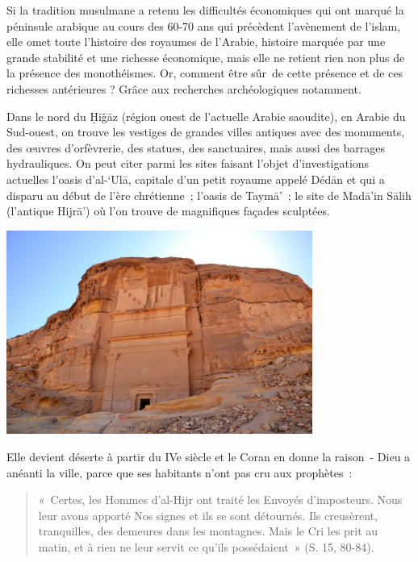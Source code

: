 Si la tradition musulmane a retenu les difficultés économiques qui ont
marqué la péninsule arabique au cours des 60-70 ans qui précèdent
l'avènement de l'islam, elle omet toute l'histoire des royaumes de
l'Arabie, histoire marquée par une grande stabilité et une richesse
économique, mais elle ne retient rien non plus de la présence des
monothéismes. Or, comment être sûr~de cette présence et de ces richesses
antérieures ? Grâce aux recherches archéologiques notamment.


Dans le nord du Ḥiǧāz (région ouest de l'actuelle Arabie saoudite), en
Arabie du Sud-ouest, on trouve les vestiges de grandes villes antiques
avec des monuments, des œuvres d'orfèvrerie, des statues, des
sanctuaires, mais aussi des barrages hydrauliques. On peut citer parmi
les sites faisant l'objet d'investigations actuelles l'oasis d'al-`Ulā,
capitale d'un petit royaume appelé Dédān et qui a disparu au début de
l'ère chrétienne~; l'oasis de Taymā'~; le site de Madā'in Sālih
(l'antique Hijrā') où l'on trouve de magnifiques façades sculptées.

\includegraphics[width=3.94921in,height=2.63264in]{Images/image028.jpg}

Elle devient déserte à partir du IVe siècle et le Coran en donne la
raison~- Dieu a anéanti la ville, parce que ses habitants n'ont pas cru
aux prophètes~:
\begin{quote}
    «~Certes, les Hommes d'al-Hijr ont traité les Envoyés d'imposteurs. Nous
leur avons apporté Nos signes et ils se sont détournés. Ils creusèrent,
tranquilles, des demeures dans les montagnes. Mais le Cri les prit au
matin, et à rien ne leur servit ce qu'ils possédaient~» (S. 15,
80-84).
\end{quote}



